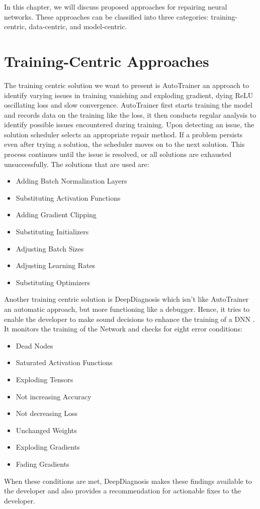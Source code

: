 In this chapter, we will discuss proposed approaches for repairing neural networks.
These approaches \cite{nakagawa_experience_2023} can be classified into three categories: training-centric, data-centric, and model-centric.

\section{Training-Centric Approaches}\label{sec:training-centric-approaches}
The training centric solution we want to present is AutoTrainer\cite{zhang_autotrainer_2021} an approach to identify varying issues in training vanishing and exploding gradient, dying ReLU oscillating loss and slow convergence.
AutoTrainer first starts training the model and records data on the training like the loss, it then conducts regular analysis to identify possible issues encountered during training.
Upon detecting an issue, the solution scheduler selects an appropriate repair method.
If a problem persists even after trying a solution, the scheduler moves on to the next solution.
This process continues until the issue is resolved, or all solutions are exhausted unsuccessfully.
The solutions that are used are:
\begin{itemize}
    \item Adding Batch Normalization Layers
    \item Substituting Activation Functions
    \item Adding Gradient Clipping
    \item Substituting Initializers
    \item Adjusting Batch Sizes
    \item Adjusting Learning Rates
    \item Substituting Optimizers
\end{itemize}
Another training centric solution is DeepDiagnosis which isn't like AutoTrainer an automatic approach, but more functioning like a debugger.
Hence, it tries to enable the developer to make sound decisions to enhance the training of a DNN .
It monitors the training of the Network and checks for eight error conditions:
\begin{itemize}
    \item Dead Nodes
    \item Saturated Activation Functions
    \item Exploding Tensors
    \item Not increasing Accuracy
    \item Not decreasing Loss
    \item Unchanged Weights
    \item Exploding Gradients
    \item Fading Gradients
\end{itemize}
When these conditions are met, DeepDiagnosis\cite{wardat_deepdiagnosis_2021} makes these findings available to the developer and also provides a recommendation for actionable fixes to the developer.
